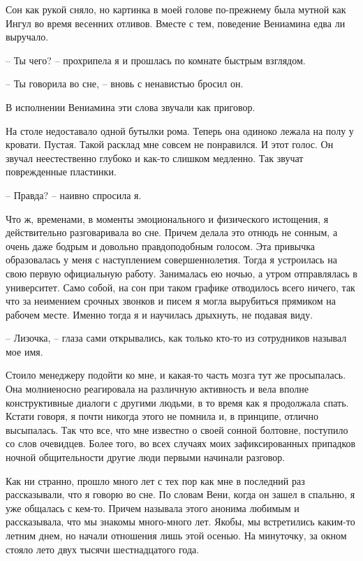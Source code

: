 \documentclass[
]{book}
\begin{document}
Сон как рукой сняло, но картинка в моей голове по-прежнему была мутной как Ингул во время весенних отливов. Вместе с тем, поведение Вениамина едва ли выручало.

-- Ты чего? -- прохрипела я и прошлась по комнате быстрым взглядом.

-- Ты говорила во сне, -- вновь с ненавистью бросил он.

В исполнении Вениамина эти слова звучали как приговор.

На столе недоставало одной бутылки рома. Теперь она одиноко лежала на полу у кровати. Пустая. Такой расклад мне совсем не понравился. И этот голос. Он звучал неестественно глубоко и как-то слишком медленно. Так звучат поврежденные пластинки.

-- Правда? -- наивно спросила я.

Что ж, временами, в моменты эмоционального и физического истощения, я действительно разговаривала во сне. Причем делала это отнюдь не сонным, а очень даже бодрым и довольно правдоподобным голосом. Эта привычка образовалась у меня с наступлением совершеннолетия. Тогда я устроилась на свою первую официальную работу. Занималась ею ночью, а утром отправлялась в университет. Само собой, на сон при таком графике отводилось всего ничего, так что за неимением срочных звонков и писем я могла вырубиться прямиком на рабочем месте. Именно тогда я и научилась дрыхнуть, не подавая виду.

-- Лизочка, -- глаза сами открывались, как только кто-то из сотрудников называл мое имя.

Стоило менеджеру подойти ко мне, и какая-то часть мозга тут же просыпалась. Она молниеносно реагировала на различную активность и вела вполне конструктивные диалоги с другими людьми, в то время как я продолжала спать. Кстати говоря, я почти никогда этого не помнила и, в принципе, отлично высыпалась. Так что все, что мне известно о своей сонной болтовне, поступило со слов очевидцев. Более того, во всех случаях моих зафиксированных припадков ночной общительности другие люди первыми начинали разговор.

Как ни странно, прошло много лет с тех пор как мне в последний раз рассказывали, что я говорю во сне. По словам Вени, когда он зашел в спальню, я уже общалась с кем-то. Причем называла этого анонима любимым и рассказывала, что мы знакомы много-много лет. Якобы, мы встретились каким-то летним днем, но начали отношения лишь этой осенью. На минуточку, за окном стояло лето двух тысячи шестнадцатого года.
\end{document}
